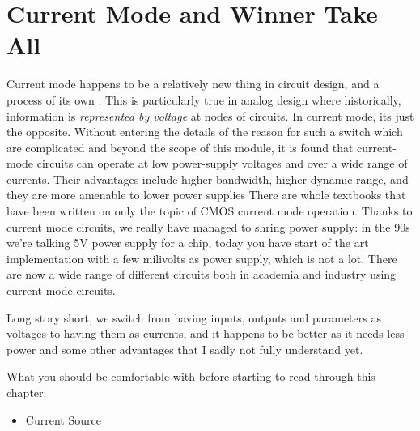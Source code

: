 \section{Current Mode and Winner Take All}

Current mode happens to be a relatively new thing in circuit design, and a process of its own . This is particularly true in analog design where historically, information is \textit{represented by voltage} at nodes of circuits. In current mode, its just the opposite. Without entering the details of the reason for such a switch which are complicated and beyond the scope of this module, it is found that current-mode circuits can operate at low power-supply voltages and over a wide range of currents. Their advantages include higher bandwidth, higher dynamic range, and they are more amenable to lower power
supplies There are whole textbooks that have been written on only the topic of CMOS current mode operation. Thanks to current mode circuits, we really have managed to shring power supply: in the 90s we're talking 5V power supply for a chip, today you have start of the art implementation with a few milivolts as power supply, which is not a lot. There are now a wide range of different circuits both in academia and industry using current mode circuits. 

Long story short, we switch from having inputs, outputs and parameters as voltages to having them as currents, and it happens to be better as it needs less power and some other advantages that I sadly not fully understand yet. 

What you should be comfortable with before starting to read through this chapter: 

\begin{itemize}
    \item Current Source
\end{itemize}










